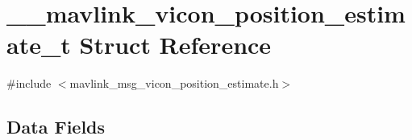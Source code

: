 \hypertarget{struct____mavlink__vicon__position__estimate__t}{\section{\+\_\+\+\_\+mavlink\+\_\+vicon\+\_\+position\+\_\+estimate\+\_\+t Struct Reference}
\label{struct____mavlink__vicon__position__estimate__t}
}


{\ttfamily \#include $<$mavlink\+\_\+msg\+\_\+vicon\+\_\+position\+\_\+estimate.\+h$>$}

\subsection*{Data Fields}
